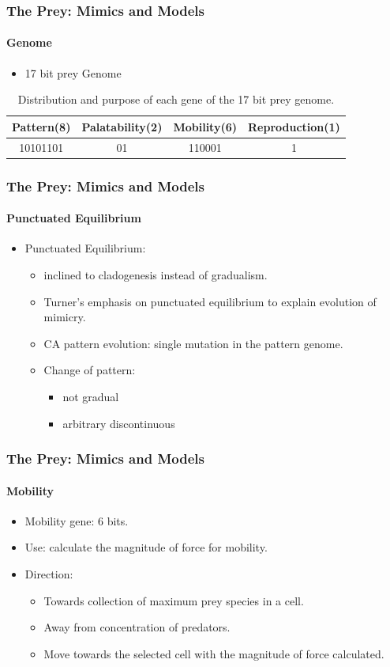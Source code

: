 \frame
{
	\frametitle{The Prey: Mimics and Models}
	\framesubtitle{Genome}
	
	\begin{itemize}
		\item 17 bit prey Genome
	\end{itemize}
	
	\begin{table}[H]
	\centering
	\begin{scriptsize}
	\begin{spacing}{1.5}
	\begin{tabular}{|c|c|c|c|}
		\hline
			\textbf{Pattern(8)} & \textbf{Palatability(2)} & \textbf{Mobility(6)} & \textbf{Reproduction(1)} \\ \hline
			10101101					 	& 							01		 		 & 			110001					&					1						 		 \\ \hline
	\end{tabular}
	\end{spacing}
	\end{scriptsize}
	\caption{Distribution and purpose of each gene of the 17 bit prey genome.}
	\label{tab:prey-genome}
	\end{table}
}

\frame
{
	\frametitle{The Prey: Mimics and Models}
	\framesubtitle{Punctuated Equilibrium}
	
	\begin{itemize}
		\item Punctuated Equilibrium:
			\begin{itemize}
				\item inclined to cladogenesis instead of gradualism.
				\item Turner's emphasis on punctuated equilibrium to explain evolution of mimicry.
				\item CA pattern evolution: single mutation in the pattern genome.
				\item Change of pattern: 
					\begin{itemize}
						\item not gradual
						\item arbitrary discontinuous
					\end{itemize}
			\end{itemize}
	\end{itemize}
}

\frame
{
	\frametitle{The Prey: Mimics and Models}
	\framesubtitle{Mobility}
	
	\begin{itemize}
		\item Mobility gene: 6 bits. 
		\item Use: calculate the magnitude of force for mobility.
		\item Direction:
			\begin{itemize}
				\item Towards collection of maximum prey species in a cell.
				\item Away from concentration of predators.
				\item Move towards the selected cell with the magnitude of force calculated.
			\end{itemize}
	\end{itemize}
}

